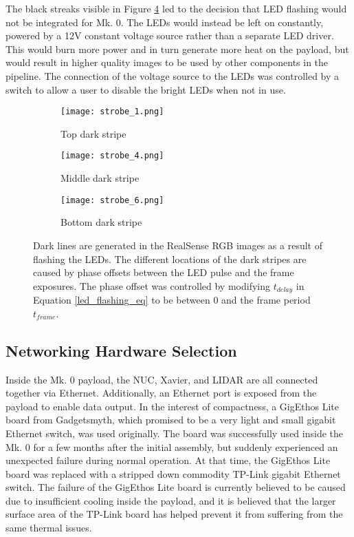 The black streaks visible in Figure \ref{strobe_images} led to the decision that LED flashing would not be integrated for Mk. 0. The LEDs would instead be left on constantly, powered by a 12V constant voltage source rather than a separate LED driver. This would burn more power and in turn generate more heat on the payload, but would result in higher quality images to be used by other components in the pipeline. The connection of the voltage source to the LEDs was controlled by a switch to allow a user to disable the bright LEDs when not in use.
		
\begin{figure}
	\centering
	\begin{subfigure}{0.32\textwidth}
		\texttt{[image: strobe\_1.png]}
		\caption{Top dark stripe}
		\label{strobe_top}
	\end{subfigure}		
	\hfill
	\begin{subfigure}{0.32\textwidth}
		\texttt{[image: strobe\_4.png]}
		\caption{Middle dark stripe}
		\label{strobe_middle}		
	\end{subfigure}
	\hfill
	\begin{subfigure}{0.32\textwidth}
		\texttt{[image: strobe\_6.png]}
		\caption{Bottom dark stripe}
		\label{strobe_bottom}
	\end{subfigure}	
	\caption[Dark lines in RealSense RGB images with LED flashing]{Dark lines are generated in the RealSense RGB images as a result of flashing the LEDs. The different locations of the dark stripes are caused by phase offsets between the LED pulse and the frame exposures. The phase offset was controlled by modifying $t_{delay}$ in Equation \ref{led_flashing_eq} to be between 0 and the frame period $t_{frame}$.}
	\label{strobe_images}
\end{figure}	

\subsection{Networking Hardware Selection}
Inside the Mk. 0 payload, the NUC, Xavier, and LIDAR are all connected together via Ethernet. Additionally, an Ethernet port is exposed from the payload to enable data output. In the interest of compactness, a GigEthos Lite board from Gadgetsmyth, which promised to be a very light and small gigabit Ethernet switch, was used originally. The board was successfully used inside the Mk. 0 for a few months after the initial assembly, but suddenly experienced an unexpected failure during normal operation. At that time, the GigEthos Lite board was replaced with a stripped down commodity TP-Link gigabit Ethernet switch. The failure of the GigEthos Lite board is currently believed to be caused due to insufficient cooling inside the payload, and it is believed that the larger surface area of the TP-Link board has helped prevent it from suffering from the same thermal issues.

